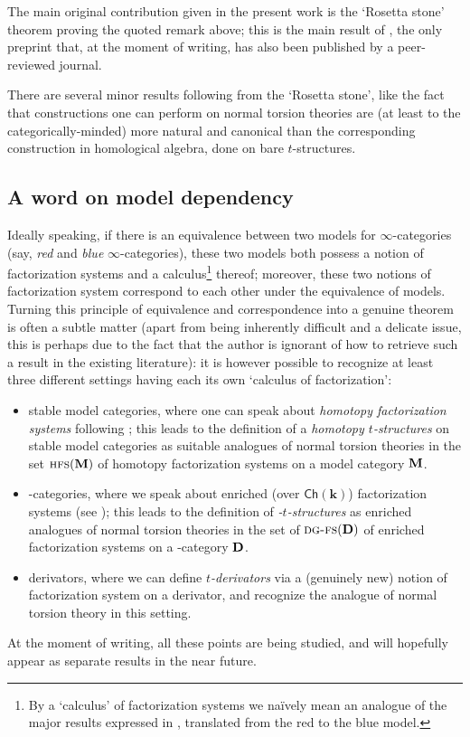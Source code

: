 The main original contribution given in the present work is the `Rosetta stone' theorem proving the quoted remark above; this is the main result of \cite{FL0}, the only preprint that, at the moment of writing, has also been published by a peer\hyp{}reviewed journal.

There are several minor results following from the `Rosetta stone', like the fact that constructions one can perform on normal torsion theories are (at least to the categorically\hyp{}minded) more natural and canonical than the corresponding construction in homological algebra, done on bare $t$\hyp{}structures.
\subsection*{A word on model dependency}\label{sec:model.dep}
Ideally speaking, if there is an equivalence between two models for $\infty$\hyp{}categories (say, \emph{red} and \emph{blue} $\infty$\hyp{}categories), these two models both possess a notion of factorization systems and a calculus\footnote{By a `calculus' of factorization systems we na\"ively mean an analogue of the major results expressed in \achap {}, translated from the red to the blue model.} thereof; moreover, these two notions of factorization system correspond to each other under the equivalence of models. Turning this principle of equivalence and correspondence into a genuine theorem is often a subtle matter (apart from being inherently difficult and a delicate issue, this is perhaps due to the fact that the author is ignorant of how to retrieve such a result in the existing literature): it is however possible to recognize at least three different settings having each its own `calculus of factorization':
\begin{itemize}
\item stable model categories, where one can speak about \emph{homotopy factorization systems} following \cite{bousfield1977constructions,Joy}; this leads to the definition of a \emph{homotopy $t$\hyp{}structures} on stable model categories as suitable analogues of normal torsion theories in the set $\text{\scshape hfs}(\mathbf{M})$ of homotopy factorization systems on a model category $\mathbf{M}$.
\item \dg\hyp{}categories, where we speak about enriched (over $\textsf{Ch}(\mathbf{k})$) factorization systems (see \cite{Day1974}); this leads to the definition of \emph{\hyp{}$t$\hyp{}structures} as enriched analogues of normal torsion theories in the set of $\text{\scshape dg-fs}(\mathbf{D})$ of enriched factorization systems on a \dg\hyp{}category $\mathbf{D}$.
\item derivators, where we can define \emph{$t$\hyp{}derivators} via a (genuinely new) notion of factorization system on a derivator, and recognize the analogue of normal torsion theory in this setting. 
\end{itemize}
At the moment of writing, all these points are being studied, and will hopefully appear as separate results in the near future.
